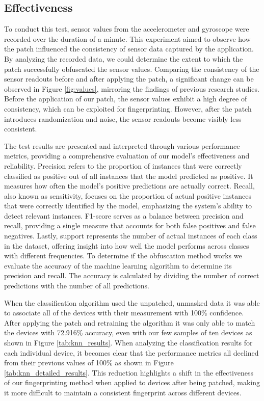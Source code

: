 \documentclass[11pt,
  oneside,openany,    %
]{scrreprt}
\begin{document}
\subsection{Effectiveness}
\label{subsec:effectiveness}
To conduct this test, sensor values from the accelerometer and gyroscope were recorded over the duration of a minute.
This experiment aimed to observe how the patch influenced the consistency of sensor data captured by the application.
By analyzing the recorded data, we could determine the extent to which the patch successfully obfuscated the sensor values.
Comparing the consistency of the sensor readouts before and after applying the patch, a significant change can be observed in Figure \ref{fig:values}, mirroring the findings of previous research studies. 
Before the application of our patch, the sensor values exhibit a high degree of consistency, which can be exploited for fingerprinting.
However, after the patch introduces randomization and noise, the sensor readouts become visibly less consistent.

The test results are presented and interpreted through various performance metrics, providing a comprehensive evaluation of our model's effectiveness and reliability.
Precision refers to the proportion of instances that were correctly classified as positive out of all instances that the model predicted as positive.
It measures how often the model's positive predictions are actually correct.
Recall, also known as sensitivity, focuses on the proportion of actual positive instances that were correctly identified by the model, emphasizing the system's ability to detect relevant instances.
F1-score serves as a balance between precision and recall, providing a single measure that accounts for both false positives and false negatives.
Lastly, support represents the number of actual instances of each class in the dataset, offering insight into how well the model performs across classes with different frequencies.
To determine if the obfuscation method works we evaluate the accuracy of the machine learning algorithm to determine its precision and recall.
The accuracy is calculated by dividing the number of correct predictions with the number of all predictions.

When the classification algorithm used the unpatched, unmasked data it was able to associate all of the devices with their measurement with 100\% confidence.
After applying the patch and retraining the algorithm it was only able to match the devices with 72.916\% accuracy, even with our few samples of ten devices as shown in Figure \ref{tab:knn_results}. 
When analyzing the classification results for each individual device, it becomes clear that the performance metrics all declined from their previous values of 100\% as shown in Figure \ref{tab:knn_detailed_results}.
This reduction highlights a shift in the effectiveness of our fingerprinting method when applied to devices after being patched, making it more difficult to maintain a consistent fingerprint across different devices.
\end{document}
